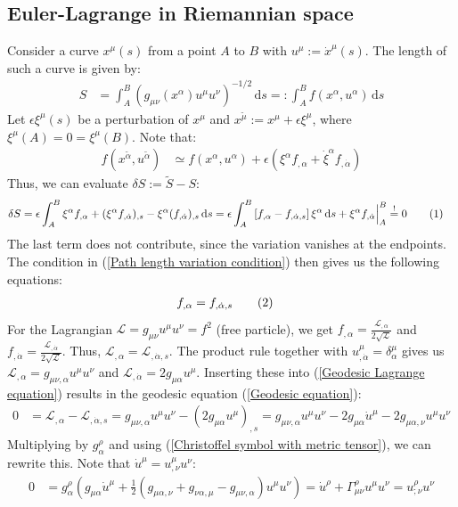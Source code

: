 \documentclass[a4paper,12pt]{article}
\newcommand\numberthis{\addtocounter{equation}{1}\tag{\theequation}}
\newcommand{\intx}{}
\newcommand{\kla}{}
\newcommand{\klam}{}
\begin{document}
\subsection{Euler-Lagrange in Riemannian space}
Consider a curve $x^\mu(s)$ from a point $A$ to $B$ with $u^\mu :=\dot{x}^\mu (s)$. The length of such a curve is given by:
\begin{align*}
S&=\intx\int_{A}^{B}\kla\left( {g_{\mu\nu}(x^\alpha)u^\mu u^\nu} \right)^{-1/2}\,\mathrm{d}s=:\intx\int_{A}^{B}f(x^\alpha, u^\alpha)\,\mathrm{d}s
\end{align*}
Let $\epsilon\xi^\mu(s)$ be a perturbation of $x^\mu$ and $x^{\tilde{\mu}}:=x^\mu+\epsilon\xi^\mu$, where $\xi^\mu(A)=0=\xi^\mu(B)$. Note that:
\begin{align*}
f(x^{\tilde{\alpha}},u^{\tilde{\alpha}})&\simeq f(x^\alpha,u^\alpha)+\epsilon\kla\left( {\xi^\alpha f_{,\alpha}+\dot{\xi}^\alpha f_{,\dot{\alpha}}} \right)
\end{align*}
Thus, we can evaluate $\delta S:=\tilde{S}-S$:
\begin{align*}
\delta S&=\epsilon\intx\int_{A}^{B}\xi^\alpha f_{,\alpha}+(\xi^\alpha f_{,\dot{\alpha}})_{,s}-\xi^\alpha(f_{,\dot{\alpha}})_{,s}\,\mathrm{d}s=\epsilon\intx\int_{A}^{B}\klam\left[ {f_{,\alpha}-f_{,\dot{\alpha},s}} \right]\xi^\alpha \,\mathrm{d}s+\xi^\alpha f_{,\dot{\alpha}}\Big\vert_A^B\overset{!}{=}0\numberthis\label{Path length variation condition}
\end{align*}
The last term does not contribute, since the variation vanishes at the endpoints. The condition in (\ref{Path length variation condition}) then gives us the following equations:
\begin{align*}
f_{,\alpha}&=f_{,\dot{\alpha},s}\numberthis\label{Geodesic Lagrange equation}
\end{align*}
For the Lagrangian $\mathcal{L}=g_{\mu\nu}u^\mu u^\nu=f^2$ (free particle), we get $f_{,\alpha}=\frac{\mathcal{L}_{,\alpha}}{2\sqrt{\mathcal{L}}}$ and $f_{,\dot{\alpha}}=\frac{\mathcal{L}_{,\dot{\alpha}}}{2\sqrt{\mathcal{L}}}$. Thus, $\mathcal{L}_{,\alpha}=\mathcal{L}_{,\dot{\alpha},s}$. The product rule together with $u^\mu_{,\dot{\alpha}}=\delta^\mu_\alpha$ gives us $\mathcal{L}_{,\alpha}=g_{\mu\nu,\alpha}u^\mu u^\nu$ and $\mathcal{L}_{,\dot{\alpha}}=2g_{\mu\alpha}u^\mu$. Inserting these into (\ref{Geodesic Lagrange equation}) results in the geodesic equation (\ref{Geodesic equation}):
\begin{align*}
0&=\mathcal{L}_{,\alpha}-\mathcal{L}_{,\dot{\alpha},s}=g_{\mu\nu,\alpha}u^\mu u^\nu - (2g_{\mu\alpha}u^\mu)_{,s}=g_{\mu\nu,\alpha}u^\mu u^\nu - 2g_{\mu\alpha}\dot{u}^\mu - 2g_{\mu\alpha,\nu}u^\mu u^\nu
\end{align*}
Multiplying by $g^\rho_\alpha$ and using (\ref{Christoffel symbol with metric tensor}), we can rewrite this. Note that $\dot{u}^\mu =u^\mu_{,\nu}u^\nu$:
\begin{align*}
0&=g^\rho_\alpha \kla\left( {g_{\mu\alpha}\dot{u}^\mu + \frac{1}{2}\kla\left( {g_{\mu\alpha,\nu}+g_{\nu\alpha,\mu}-g_{\mu\nu,\alpha}} \right)u^\mu u^\nu} \right)=\dot{u}^\rho + \Gamma^\rho_{\mu\nu}u^\mu u^\nu=u^\rho_{;\nu}u^\nu
\end{align*}
\end{document}
